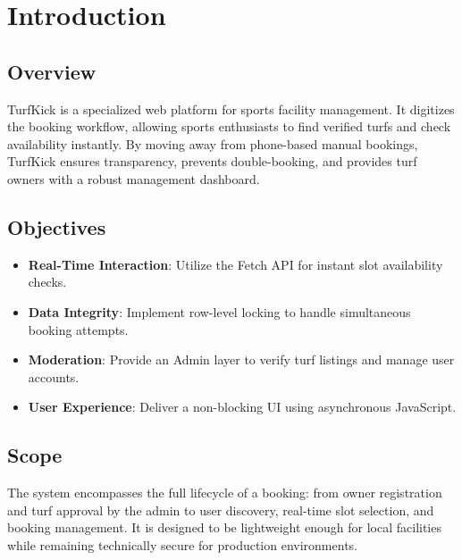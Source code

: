 \documentclass[12pt,a4paper]{report}
\begin{document}
\tableofcontents
\newpage

\chapter{Introduction}
\section{Overview}
TurfKick is a specialized web platform for sports facility management. It digitizes the booking workflow, allowing sports enthusiasts to find verified turfs and check availability instantly. By moving away from phone-based manual bookings, TurfKick ensures transparency, prevents double-booking, and provides turf owners with a robust management dashboard.

\section{Objectives}
\begin{itemize}
    \item \textbf{Real-Time Interaction}: Utilize the Fetch API for instant slot availability checks.
    \item \textbf{Data Integrity}: Implement row-level locking to handle simultaneous booking attempts.
    \item \textbf{Moderation}: Provide an Admin layer to verify turf listings and manage user accounts.
    \item \textbf{User Experience}: Deliver a non-blocking UI using asynchronous JavaScript.
\end{itemize}

\section{Scope}
The system encompasses the full lifecycle of a booking: from owner registration and turf approval by the admin to user discovery, real-time slot selection, and booking management. It is designed to be lightweight enough for local facilities while remaining technically secure for production environments.

\end{document}
